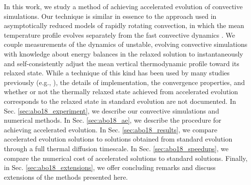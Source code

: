 In this work, we study a method of achieving accelerated evolution of convective simulations. 
Our technique is similar in essence to the approach used in asymptotically reduced models of rapidly rotating convection, in which the mean temperature profile evolves separately from the fast convective dynamics \cite{julien&all1998, sprague&all2006}. 
We couple measurements of the dynamics of unstable, evolving convective simulations with knowledge about energy balances in the relaxed solution to instantaneously and self-consistently adjust the mean vertical thermodynamic profile toward its relaxed state. 
While a technique of this kind has been used by many studies previously (e.g., \cite{hurlburt&all1986}), the details of implementation, the convergence properties, and whether or not the thermally relaxed state achieved from accelerated evolution corresponds to the relaxed state in standard evolution are not documented.
In Sec. \ref{sec:abo18_experiment}, we describe our convective simulations and numerical methods. 
In Sec. \ref{sec:abo18_ae}, we describe the procedure for achieving accelerated evolution. 
In Sec. \ref{sec:abo18_results}, we compare accelerated evolution solutions to solutions obtained from standard evolution through a full thermal diffusion timescale. 
In Sec. \ref{sec:abo18_speedups}, we compare the numerical cost of accelerated solutions to standard solutions.
Finally, in Sec. \ref{sec:abo18_extensions}, we offer concluding remarks and discuss extensions of the methods presented here.



